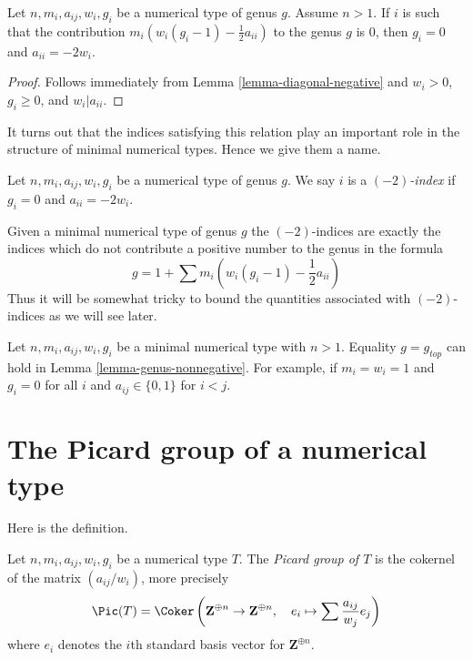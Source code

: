 \begin{lemma}
\label{lemma-minus-two}
Let $n, m_i, a_{ij}, w_i, g_i$ be a numerical type of genus $g$.
Assume $n > 1$. If $i$ is such that the contribution
$m_i(w_i(g_i - 1) - \frac{1}{2} a_{ii})$
to the genus $g$ is $0$, then $g_i = 0$ and $a_{ii} = -2w_i$.
\end{lemma}

\begin{proof}
Follows immediately from Lemma \ref{lemma-diagonal-negative} and
$w_i > 0$, $g_i \geq 0$, and $w_i | a_{ii}$.
\end{proof}

\noindent
It turns out that the indices satisfying this relation play an
important role in the structure of minimal numerical types.
Hence we give them a name.

\begin{definition}
\label{definition-type-minus-two}
Let $n, m_i, a_{ij}, w_i, g_i$ be a numerical type of genus $g$.
We say $i$ is a {\it $(-2)$-index} if $g_i = 0$ and $a_{ii} = -2w_i$.
\end{definition}

\noindent
Given a minimal numerical type of genus $g$ the $(-2)$-indices
are exactly the indices which do not contribute a positive number
to the genus in the formula
$$
g = 1 + \sum m_i(w_i(g_i - 1) - \frac{1}{2} a_{ii})
$$
Thus it will be somewhat tricky to bound the quantities associated
with $(-2)$-indices as we will see later.

\begin{remark}
\label{remark-genus-equality}
Let $n, m_i, a_{ij}, w_i, g_i$ be a minimal numerical type with $n > 1$.
Equality $g = g_{top}$ can hold in Lemma \ref{lemma-genus-nonnegative}.
For example, if $m_i = w_i = 1$ and $g_i = 0$ for all $i$ and
$a_{ij} \in \{0, 1\}$ for $i < j$.
\end{remark}


\section{The Picard group of a numerical type}
\label{section-picard-group}

\noindent
Here is the definition.

\begin{definition}
\label{definition-picard-group}
Let $n, m_i, a_{ij}, w_i, g_i$ be a numerical type $T$. The
{\it Picard group of $T$} is the cokernel of the matrix
$(a_{ij}/w_i)$, more precisely
$$
\Pic(T) =
\Coker\left(
\mathbf{Z}^{\oplus n} \to \mathbf{Z}^{\oplus n},\quad
e_i
\mapsto
\sum \frac{a_{ij}}{w_j}e_j
\right)
$$
where $e_i$ denotes the $i$th standard basis vector for $\mathbf{Z}^{\oplus n}$.
\end{definition}

